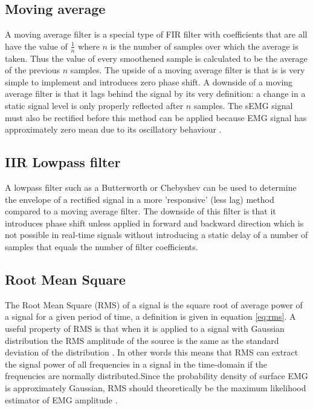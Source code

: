 \subsection{Moving average}
A moving average filter is a special type of FIR filter with coefficients that are all have the value of $\frac{1}{n}$ where $n$ is the number of samples over which the average is taken. Thus the value of every smoothened sample is calculated to be the average of the previous $n$ samples. The upside of a moving average filter is that is is very simple to implement and introduces zero phase shift. A downside of a moving average filter is that it lags behind the signal by its very definition: a change in a static signal level is only properly reflected after $n$ samples. The sEMG signal must also be rectified before this method can be applied because EMG signal has approximately zero mean due to its oscillatory behaviour \cite{rose2011electromyogram}. 

\subsection{IIR Lowpass filter}
A lowpass filter such as a Butterworth or Chebyshev can be used to determine the envelope of a rectified signal in a more 'responsive' (less lag) method compared to a moving average filter. The downside of this filter is that it introduces phase shift unless applied in forward and backward direction \cite{rose2011electromyogram} which is not possible in real-time signals without introducing a static delay of a number of samples that equals the number of filter coefficients.

\subsection{Root Mean Square}
The Root Mean Square (RMS) of a signal is the square root of average power of a signal for a given period of time, a definition is given in equation \ref{eq:rms}. A useful property of RMS is that when it is applied to a signal with Gaussian distribution the RMS amplitude of the source is the same as the standard deviation of the distribution \cite{rms_standard_deviation}. In other words this means that RMS can extract the signal power of all frequencies in a signal in the time-domain if the frequencies are normally distributed.Since the probability density of surface EMG is approximately Gaussian, RMS should theoretically be the maximum likelihood estimator of EMG amplitude \cite{semg_signals_analysis_and_applications}.

